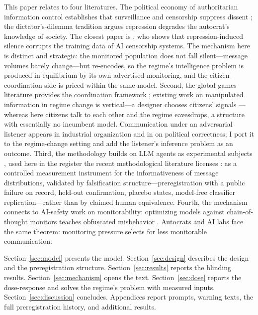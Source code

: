 \documentclass[11pt]{article}
\theoremstyle{remark}
\begin{document}
This paper relates to four literatures. The political economy of authoritarian information control establishes that surveillance and censorship suppress dissent \citep{king2013, roberts2018, xu2021, guriev2019}; the dictator's-dilemma tradition \citep{wintrobe1998, egorov2009, lorentzen2014, gehlbach2026} argues repression degrades the autocrat's knowledge of society. The closest paper is \citet{yang2025}, who shows that repression-induced silence corrupts the training data of AI censorship systems. The mechanism here is distinct and strategic: the monitored population does not fall silent---message volumes barely change---but re-encodes, so the regime's intelligence problem is produced in equilibrium by its own advertised monitoring, and the citizen-coordination side is priced within the same model. Second, the global-games literature provides the coordination framework \citep{carlsson1993, morris2003, angeletos2007a}; existing work on manipulated information in regime change is vertical---a designer chooses citizens' signals \citep{edmond2013, inostroza2025}---whereas here citizens talk to each other and the regime eavesdrops, a structure with essentially no incumbent model. Communication under an adversarial listener appears in industrial organization \citep{spector2022} and in \citet{braghieri2024} on political correctness; I port it to the regime-change setting and add the listener's inference problem as an outcome. Third, the methodology builds on LLM agents as experimental subjects \citep{horton2023, mei2024}, used here in the register the recent methodological literature licenses \citep{ludwig2025}: as a controlled measurement instrument for the informativeness of message distributions, validated by falsification structure---preregistration with a public failure on record, held-out confirmation, placebo states, model-free classifier replication---rather than by claimed human equivalence. Fourth, the mechanism connects to AI-safety work on monitorability: optimizing models against chain-of-thought monitors teaches obfuscated misbehavior \citep{baker2025, motwani2024}. Autocrats and AI labs face the same theorem: monitoring pressure selects for less monitorable communication.

Section~\ref{sec:model} presents the model. Section~\ref{sec:design} describes the design and the preregistration structure. Section~\ref{sec:results} reports the blinding results. Section~\ref{sec:mechanism} opens the text. Section~\ref{sec:dose} reports the dose-response and solves the regime's problem with measured inputs. Section~\ref{sec:discussion} concludes. Appendices report prompts, warning texts, the full preregistration history, and additional results.
\end{document}
